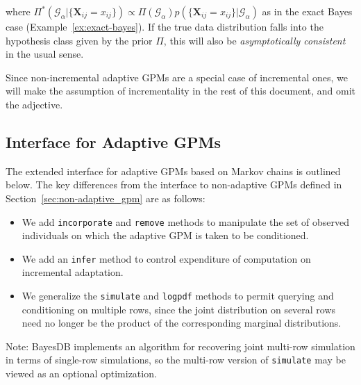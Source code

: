 \documentclass[10pt,letterpaper]{article}
\newcommand{\set}[1]{\{#1\}}
\newcommand{\G}{\mathcal{G}}
\begin{document}
where $\Pi^*(\G_\alpha|\set{\mathbf{X}_{ij}=x_{ij}}) \propto 
\Pi(\G_\alpha) p(\set{\mathbf{X}_{ij}=x_{ij}}|\G_\alpha)$
as in the exact Bayes case (Example~\ref{ex:exact-bayes}).
If the true data distribution falls into the hypothesis class given by
the prior $\Pi$, this will also be \emph{asymptotically consistent} in
the usual sense.

Since non-incremental adaptive GPMs are a special case of incremental
ones, we will make the assumption of incrementality in the rest of
this document, and omit the adjective.

\subsection{Interface for Adaptive GPMs}
\label{sec:adaptive_gpm}

The extended interface for adaptive GPMs based on Markov chains is outlined
below.  The key differences from the interface to non-adaptive GPMs
defined in Section~\ref{sec:non-adaptive_gpm} are as follows:

\begin{itemize}
\item We add \texttt{incorporate} and \texttt{remove} methods to
  manipulate the set of observed individuals on which the adaptive GPM
  is taken to be conditioned.
\item We add an \texttt{infer} method to control expenditure of
  computation on incremental adaptation.
\item We generalize the \texttt{simulate} and \texttt{logpdf} methods
  to permit querying and conditioning on multiple rows, since the
  joint distribution on several rows need no longer be the product of
  the corresponding marginal distributions.
\end{itemize}

Note: BayesDB implements an algorithm for recovering joint multi-row
simulation in terms of single-row simulations, so the multi-row
version of \texttt{simulate} may be viewed as an optional
optimization.


\end{document}
